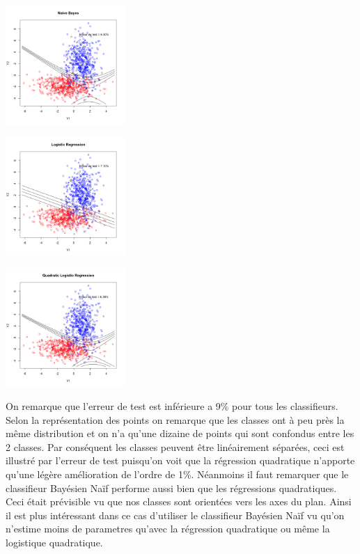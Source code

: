 \documentclass[10pt]{article}
\begin{document}
\begin{center}
	\includegraphics[width=45mm]{Figures/synth2_nb.png}
\end{center}
\begin{minipage}{.5\textwidth}
	\includegraphics[width=45mm]{Figures/synth2_logreg.png}
\end{minipage}%
\hspace{0.02\linewidth}
\begin{minipage}{.5\textwidth}
	\includegraphics[width=45mm]{Figures/synth2_logregquad.png}
\end{minipage}


On remarque que l'erreur de test est inférieure a  9\% pour tous les classifieurs. Selon la représentation des points on remarque que les classes ont à peu près la même distribution et on n'a qu'une dizaine de points qui sont confondus entre les 2 classes. Par conséquent les classes peuvent être  linéairement séparées, ceci est illustré par l'erreur de test puisqu'on voit que la régression quadratique n'apporte qu'une légère amélioration de l'ordre de 1\%.
Néanmoins il faut remarquer que le classifieur Bayésien Naïf performe aussi bien que les régressions quadratiques. Ceci était prévisible vu que nos classes sont orientées vers les axes du plan. Ainsi il est plus intéressant dans ce cas d'utiliser le classifieur Bayésien Naïf vu qu'on n'estime moins de parametres qu'avec  la régression quadratique ou même la logistique quadratique.
\end{document}
